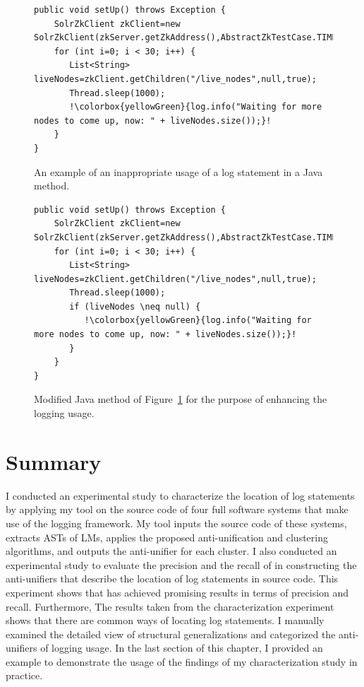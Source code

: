 \begin{figure}[p]
\def\baselinestretch{1}
\begin{lstlisting}[escapechar=!]
public void setUp() throws Exception {
    SolrZkClient zkClient=new SolrZkClient(zkServer.getZkAddress(),AbstractZkTestCase.TIMEOUT);
    for (int i=0; i < 30; i++) {
       List<String> liveNodes=zkClient.getChildren("/live_nodes",null,true);
       Thread.sleep(1000);
       !\colorbox{yellowGreen}{log.info("Waiting for more nodes to come up, now: " + liveNodes.size());}!
    }
}
\end{lstlisting}
\caption[Example 1: An example of an inappropriate usage of a log statement in a Java method.]{An example of an inappropriate usage of a log statement in a Java method.\label{inapproprate-ex1}}
\end{figure}



\begin{figure}[p]
\def\baselinestretch{1}
\begin{lstlisting}[escapechar=!]
public void setUp() throws Exception {
    SolrZkClient zkClient=new SolrZkClient(zkServer.getZkAddress(),AbstractZkTestCase.TIMEOUT);
    for (int i=0; i < 30; i++) {
       List<String> liveNodes=zkClient.getChildren("/live_nodes",null,true);
       Thread.sleep(1000);
       if (liveNodes \neq null) {
          !\colorbox{yellowGreen}{log.info("Waiting for more nodes to come up, now: " + liveNodes.size());}!
       }
    }
}
\end{lstlisting}
\caption[Example 1: An example  for the purpose of enhancing the logging usage in the Java method of Example.]{Modified Java method of Figure~\ref{inapproprate-ex1} for the purpose of enhancing the logging usage.\label{approprate-ex1}}
\end{figure}



\section{Summary}
I conducted an experimental study to characterize the location of log statements by applying my tool on the source code of four full software systems that make use of the  logging framework. My tool inputs the source code of these systems, extracts ASTs of LMs, applies the proposed anti-unification and clustering algorithms, and outputs the anti-unifier for each cluster. I also conducted an experimental study to evaluate the precision and the recall of  in constructing the anti-unifiers that describe the location of log statements in source code. This experiment shows that  has achieved promising results in terms of precision and recall. Furthermore, The results taken from the characterization experiment shows that there are common ways of locating log statements. I manually examined the detailed view of structural generalizations and categorized the anti-unifiers of logging usage. In the last section of this chapter, I provided an example to demonstrate the usage of the findings of my characterization study in practice.


